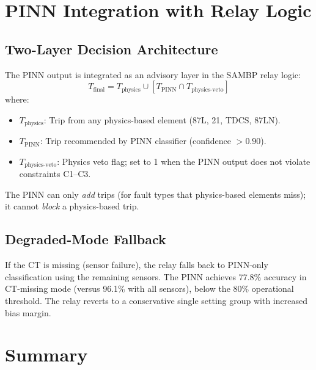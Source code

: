 \section{PINN Integration with Relay Logic}
\label{sec:ch8_integration}

\subsection{Two-Layer Decision Architecture}

The PINN output is integrated as an advisory layer in the SAMBP
relay logic:
\begin{equation}
  T_\mathrm{final} = T_\mathrm{physics} \cup
    \left[T_\mathrm{PINN} \cap T_\mathrm{physics\text{-}veto}\right]
  \label{eq:ch8_two_layer}
\end{equation}
where:
\begin{itemize}
\item $T_\mathrm{physics}$: Trip from any physics-based element
      (87L, 21, TDCS, 87LN).
\item $T_\mathrm{PINN}$: Trip recommended by PINN classifier
      (confidence $> 0.90$).
\item $T_\mathrm{physics\text{-}veto}$: Physics veto flag; set to 1 when
      the PINN output does not violate constraints C1--C3.
\end{itemize}
The PINN can only \emph{add} trips (for fault types that physics-based
elements miss); it cannot \emph{block} a physics-based trip.

\subsection{Degraded-Mode Fallback}

If the CT is missing (sensor failure), the relay falls back to PINN-only
classification using the remaining sensors. The PINN achieves 77.8\%
accuracy in CT-missing mode (versus 96.1\% with all sensors), below the
80\% operational threshold. The relay reverts to a conservative single
setting group with increased bias margin.

\section{Summary}
\label{sec:ch8_summary}

